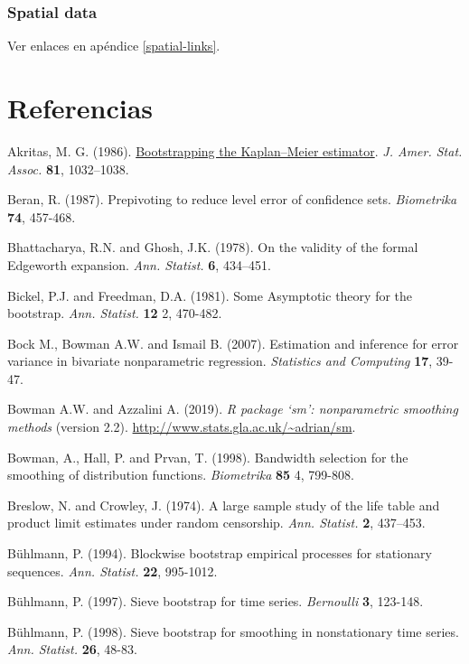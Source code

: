 \documentclass[
]{book}
\theoremstyle{break}
\theoremstyle{nonumberplain}
\begin{document}
\subsection{Spatial data}\label{spatial-data}

Ver enlaces en apéndice \ref{spatial-links}.

\chapter*{Referencias}\label{referencias}

Akritas, M. G. (1986). \href{https://www.tandfonline.com/doi/abs/10.1080/01621459.1986.10478369}{Bootstrapping the Kaplan--Meier estimator}.
\emph{J. Amer. Stat. Assoc.} \textbf{81}, 1032--1038.

Beran, R. (1987). Prepivoting to reduce level error of confidence sets.
\emph{Biometrika} \textbf{74}, 457-468.

Bhattacharya, R.N. and Ghosh, J.K. (1978). On the validity of the formal
Edgeworth expansion. \emph{Ann. Statist.} \textbf{6}, 434--451.

Bickel, P.J. and Freedman, D.A. (1981). Some Asymptotic theory for the
bootstrap. \emph{Ann. Statist.} \textbf{12} 2, 470-482.

Bock M., Bowman A.W. and Ismail B. (2007). Estimation and inference for
error variance in bivariate nonparametric regression. \emph{Statistics and Computing}
\textbf{17}, 39-47.

Bowman A.W. and Azzalini A. (2019). \emph{R package `sm': nonparametric smoothing methods}
(version 2.2). \url{http://www.stats.gla.ac.uk/~adrian/sm}.

Bowman, A., Hall, P. and Prvan, T. (1998). Bandwidth selection for the
smoothing of distribution functions. \emph{Biometrika} \textbf{85} 4, 799-808.

Breslow, N. and Crowley, J. (1974). A large sample study of the life
table and product limit estimates under random censorship. \emph{Ann.
Statist.} \textbf{2}, 437--453.

Bühlmann, P. (1994). Blockwise bootstrap empirical processes for
stationary sequences. \emph{Ann. Statist.} \textbf{22}, 995-1012.

Bühlmann, P. (1997). Sieve bootstrap for time series. \emph{Bernoulli} \textbf{3},
123-148.

Bühlmann, P. (1998). Sieve bootstrap for smoothing in nonstationary time
series. \emph{Ann. Statist.} \textbf{26}, 48-83.
\end{document}

